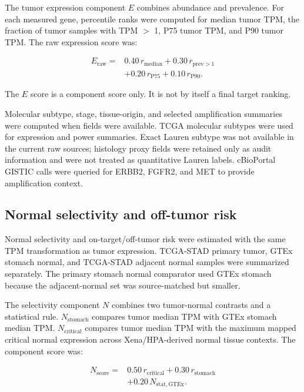 \documentclass[preprint,12pt,authoryear]{elsarticle}
\begin{document}
The tumor expression component $E$ combines abundance and prevalence. For each measured gene, percentile ranks were computed for median tumor TPM, the fraction of tumor samples with TPM \ensuremath{>} 1, P75 tumor TPM, and P90 tumor TPM. The raw expression score was:

\begin{equation}
\begin{split}
E_{\mathrm{raw}} ={}& 0.40\,r_{\mathrm{median}}
 + 0.30\,r_{\mathrm{prev>1}} \\
& + 0.20\,r_{\mathrm{P75}}
 + 0.10\,r_{\mathrm{P90}}.
\end{split}
\end{equation}

The $E$ score is a component score only. It is not by itself a final target ranking.

Molecular subtype, stage, tissue-origin, and selected amplification summaries were computed when fields were available. TCGA molecular subtypes were used for expression and power summaries. Exact Lauren subtype was not available in the current raw sources;\allowbreak{} histology proxy fields were retained only as audit information and were not treated as quantitative Lauren labels. cBioPortal GISTIC calls were queried for ERBB2, FGFR2, and MET to provide amplification context.

\subsection{Normal selectivity and off-tumor risk}

Normal selectivity and on-target/\allowbreak{}off-tumor risk were estimated with the same TPM transformation as tumor expression. TCGA-STAD primary tumor, GTEx stomach normal, and TCGA-STAD adjacent normal samples were summarized separately. The primary stomach normal comparator used GTEx stomach because the adjacent-normal set was source-matched but smaller.

The selectivity component $N$ combines two tumor-normal contrasts and a statistical rule. $N_{\mathrm{stomach}}$ compares tumor median TPM with GTEx stomach median TPM. $N_{\mathrm{critical}}$ compares tumor median TPM with the maximum mapped critical normal expression across Xena/\allowbreak{}HPA-derived normal tissue contexts. The component score was:

\begin{equation}
\begin{split}
N_{\mathrm{score}} ={}& 0.50\,r_{\mathrm{critical}}
 + 0.30\,r_{\mathrm{stomach}} \\
& + 0.20\,N_{\mathrm{stat,GTEx}}.
\end{split}
\end{equation}
\end{document}

